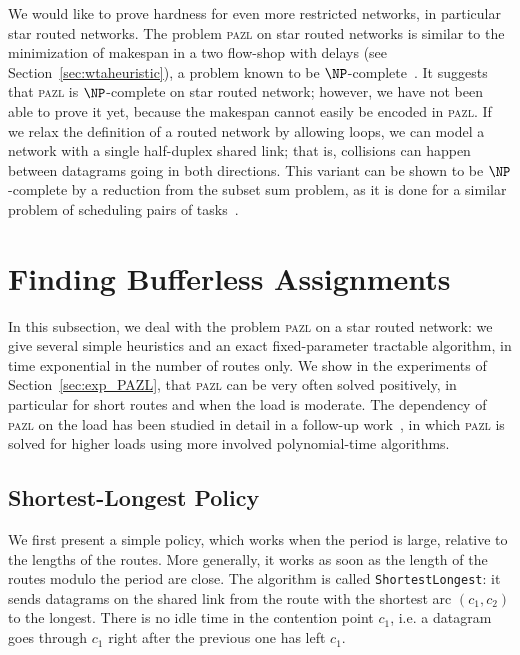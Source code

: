 \documentclass[a4paper,10pt]{journal}
\newcommand\shortestlongest{\texttt{ShortestLongest}\xspace}
\newcommand\pazl{\textsc{pazl}\xspace}
\begin{document}
We would like to prove hardness for even more restricted networks, in particular star routed networks.
The problem \pazl on star routed networks is similar to the minimization of makespan in a two flow-shop with delays (see Section~\ref{sec:wtaheuristic}), a problem known to be $\NP$-complete~\cite{yu2004minimizing}. It suggests that \pazl is $\NP$-complete on star routed network; however, we have not been able to prove it yet, because the makespan cannot easily be encoded in \pazl. If we relax the definition of a routed network by allowing loops, we can model a network with a single half-duplex shared link; that is, collisions can happen between datagrams going in both directions. This variant can be shown to be $\NP$-complete by a reduction from the subset sum problem, as it is done for a similar problem of scheduling pairs of tasks~\cite{orman1997complexity}.


\section{Finding Bufferless Assignments} \label{sec:PAZL}

In this subsection, we deal with the problem \pazl on a star routed network:
we give several simple heuristics and an exact fixed-parameter tractable algorithm, in time exponential in the number of routes only. We show in the experiments of Section~\ref{sec:exp_PAZL}, that \pazl can be very often solved positively, in particular for short routes and when the load is moderate. The dependency of \pazl on the load has been studied in detail in a follow-up work~\cite{guiraud2020scheduling}, in which \pazl is solved for higher loads using more involved polynomial-time algorithms.

\subsection{Shortest-Longest Policy}


We first present a simple policy, which works when the period is large, relative to the lengths of the routes. More generally, it works as soon as the length of the routes modulo the period are close. The algorithm is called \shortestlongest: it sends datagrams on the shared link from the route with the shortest arc $(c_1,c_2)$ to the longest. There is no idle time in the contention point $c_1$, i.e. a datagram goes through $c_1$ right after the previous one has left $c_1$.
\end{document}
